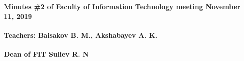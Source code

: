 \documentclass[10pt]{article}
\begin{document}
\textbf{
Minutes \#2 of Faculty of Information Technology meeting November 11, 2019 \\\\
Teachers: Baisakov B. M., Akshabayev A. K. \\\\ 
Dean of FIT Suliev R. N \\\\
}
\end{document}
